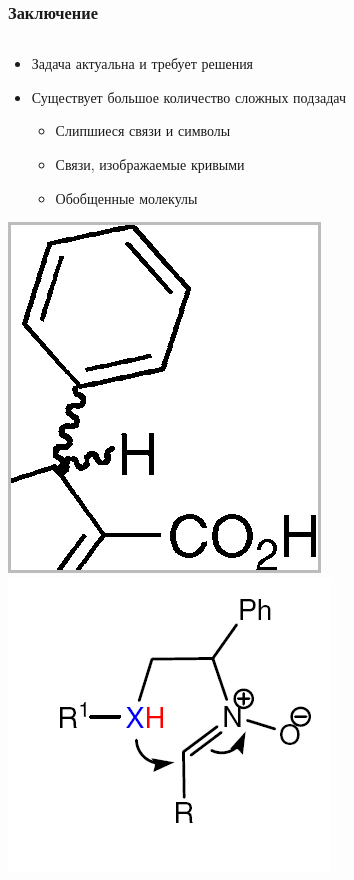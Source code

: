 \begin{frame}
  \frametitle{Заключение}
  \begin{columns}
    \begin{column}{0.7\textwidth}
  \begin{itemize}
    \item Задача актуальна и требует решения
    \item Существует большое количество сложных подзадач
      \begin{itemize}
        \item Слипшиеся связи и символы
        \item Связи, изображаемые кривыми
        \item Обобщенные молекулы
      \end{itemize}
  \end{itemize}
\centering  \includegraphics[scale=0.2]{media/complex3.png} 
  \includegraphics[scale=0.5]{media/complex.png}
\end{column}

\end{columns}
\end{frame}
